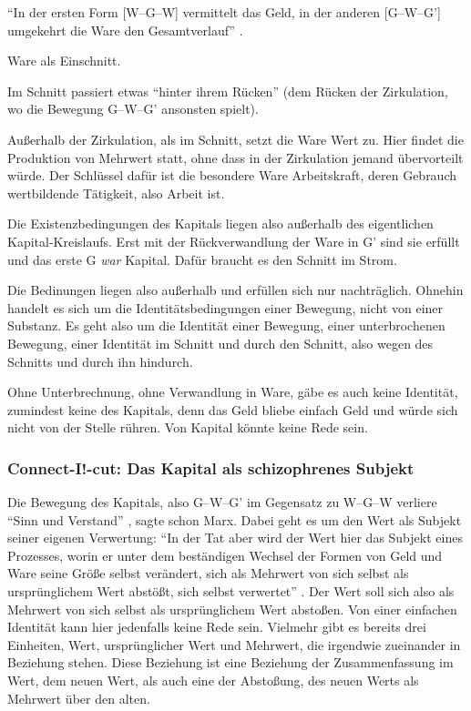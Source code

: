 \documentclass[12pt,
               DIV13,
               paper=a4,
               twoside=false,
               onehalfspacing,
               bibliography=totoc,
               toc=graduated,
               draft,
               ]{scrartcl}
\newcommand{\pc}[2]{\parencite[#1]{#2}}
\newcommand{\gwg}{G--W--G'\xspace}
\newcommand{\wgw}{W--G--W\xspace}
\begin{document}
"`In der ersten Form [\wgw] vermittelt das Geld, in der anderen [\gwg]
umgekehrt die Ware den Gesamtverlauf"' \pc{163}{kap}.

Ware als Einschnitt.

Im Schnitt passiert etwas "`hinter ihrem Rücken"' \pc{181}{kap} (dem
Rücken der Zirkulation, wo die Bewegung \gwg ansonsten spielt).

Außerhalb der Zirkulation, als im Schnitt, setzt die Ware Wert zu.
Hier findet die Produktion von Mehrwert statt, ohne dass in der
Zirkulation jemand übervorteilt würde. Der Schlüssel dafür ist die
besondere Ware Arbeitskraft, deren Gebrauch wertbildende Tätigkeit,
also Arbeit ist.

Die Existenzbedingungen des Kapitals liegen also außerhalb des
eigentlichen Kapital-Kreislaufs. Erst mit der Rückverwandlung der Ware
in G' sind sie erfüllt und das erste G \emph{war} Kapital. Dafür
braucht es den Schnitt im Strom.

Die Bedinungen liegen also außerhalb und erfüllen sich nur
nachträglich. Ohnehin handelt es sich um die Identitätsbedingungen
einer Bewegung, nicht von einer Substanz. Es geht also um die
Identität einer Bewegung, einer unterbrochenen Bewegung, einer
Identität im Schnitt und durch den Schnitt, also wegen des Schnitts
und durch ihn hindurch.

Ohne Unterbrechnung, ohne Verwandlung in Ware, gäbe es auch keine
Identität, zumindest keine des Kapitals, denn das Geld bliebe einfach
Geld und würde sich nicht von der Stelle rühren. Von Kapital könnte
keine Rede sein.



\subsubsection{Connect-I!-cut: Das Kapital als schizophrenes Subjekt}

Die Bewegung des Kapitals, also \gwg im Gegensatz zu \wgw verliere
"`Sinn und Verstand"' \pc{166}{kap}, sagte schon Marx. Dabei geht es
um den Wert als Subjekt seiner eigenen Verwertung: "`In der Tat aber
wird der Wert hier das Subjekt eines Prozesses, worin er unter dem
beständigen Wechsel der Formen von Geld und Ware seine Größe selbst
verändert, sich als Mehrwert von sich selbst als ursprünglichem Wert
abstößt, sich selbst verwertet"' \pc{169}{kap}. Der Wert soll sich
also als Mehrwert von sich selbst als ursprünglichem Wert abstoßen.
Von einer einfachen Identität kann hier jedenfalls keine Rede sein.
Vielmehr gibt es bereits drei Einheiten, Wert, ursprünglicher Wert und
Mehrwert, die irgendwie zueinander in Beziehung stehen. Diese
Beziehung ist eine Beziehung der Zusammenfassung im Wert, dem neuen
Wert, als auch eine der Abstoßung, des neuen Werts als Mehrwert über
den alten.
\end{document}
